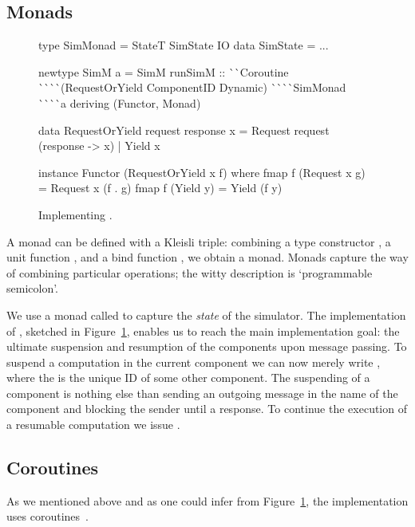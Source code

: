 \subsection{Monads}
\label{sec:impl-monads}
\begin{figure}
\begin{code}
type SimMonad  =  StateT SimState IO
data SimState  = ...

newtype SimM a
  = SimM { runSimM ::
      ^^ ^^ Coroutine
      ^^ ^^ ^^ ^^ (RequestOrYield ComponentID Dynamic)
      ^^ ^^ ^^ ^^ SimMonad
      ^^ ^^ ^^ ^^ a 
    } deriving (Functor, Monad)

data RequestOrYield request response x
  =  Request request (response -> x)
  |  Yield   x

instance Functor (RequestOrYield x f) where
  fmap f (Request x g)  = Request x (f . g)
  fmap f (Yield y)      = Yield (f y)
\end{code}
\caption{Implementing .}
\label{fig:code-simm}
\end{figure}

A monad can be defined with a Kleisli triple: combining a type constructor , a unit function , and a bind function , we obtain a monad.
Monads capture the way of combining particular operations; the witty description is `programmable semicolon'.

We use a monad called  to capture the \emph{state} of the simulator.
The implementation of \hspace{-1pt}, sketched in Figure~\ref{fig:code-simm}, enables us to reach the main implementation goal: the ultimate suspension and resumption of the components upon message passing.
To suspend a computation in the current component we can now merely write , where the  is the unique ID of some other component.
The suspending of a component is nothing else than sending an outgoing message in the name of the component and blocking the sender until a response.
To continue the execution of a resumable computation we issue  \mbox{.} %


\subsection{Coroutines}
\label{sec:impl-coroutines}
As we mentioned above and as one could infer from Figure~\ref{fig:code-simm}, the implementation uses coroutines~\cite{coroutines}.

